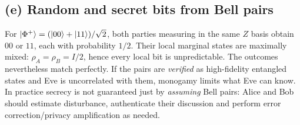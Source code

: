 \subsection*{(e) Random and secret bits from Bell pairs}
For \(\left\lvert \Phi^+\right\rangle=(\left\lvert 00\right\rangle+\left\lvert 11\right\rangle)/\sqrt2\),
both parties measuring in the same \(Z\) basis
obtain \(00\) or \(11\), each with probability \(1/2\).
Their local marginal states are maximally mixed:
\(\rho_A=\rho_B=I/2\), hence every local bit is
unpredictable. The outcomes nevertheless match
perfectly. If the pairs are \emph{verified} as
high-fidelity entangled states and Eve is
uncorrelated with them, monogamy limits what
Eve can know. In practice secrecy is not
guaranteed just by \emph{assuming} Bell pairs:
Alice and Bob should estimate disturbance,
authenticate their discussion and perform
error correction/privacy amplification as needed.
